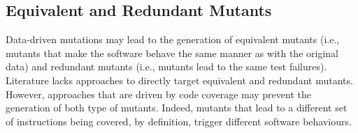 
\subsection{Equivalent and Redundant Mutants}
\label{sec:dataequivalent}

Data-driven mutations may lead to the generation of equivalent mutants (i.e., mutants that make the software behave the same manner as with the original data) and redundant mutants (i.e., mutants lead to the same test failures). Literature lacks approaches to directly target equivalent and redundant mutants. However, approaches that are driven by code coverage may prevent the generation of both type of mutants. Indeed, mutants that lead to a different set of instructions being covered, by definition, trigger different software behaviours.
